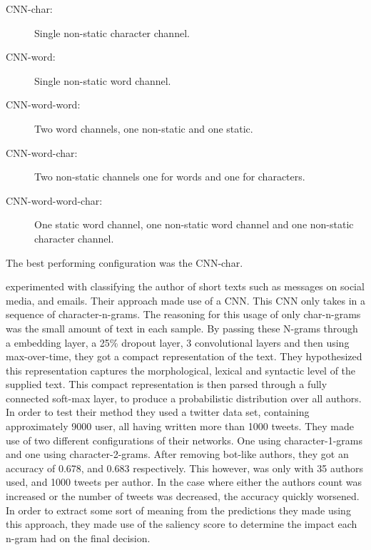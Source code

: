 \begin{description}
    \item[CNN-char:] Single non-static character channel.
    \item[CNN-word:] Single non-static word channel.
    \item[CNN-word-word:] Two word channels, one non-static and one static.
    \item[CNN-word-char:] Two non-static channels one for words and one for
        characters.
    \item[CNN-word-word-char:] One static word channel, one non-static word
        channel and one non-static character channel.
\end{description}

The best performing configuration was the CNN-char.

\citet{shrestha2017} experimented with classifying the author of short texts
such as messages on social media, and emails. Their approach made use of a
\gls{CNN}. This \gls{CNN} only takes in a sequence of character-n-grams. The
reasoning for this usage of only char-n-grams was the small amount of text
in each sample. By passing these N-grams through a embedding layer, a 25\%
dropout layer, 3 convolutional layers and then using max-over-time, they got
a compact representation of the text. They hypothesized this representation
captures the morphological, lexical and syntactic level of the supplied text.
This compact representation is then parsed through a fully connected soft-max
layer, to produce a probabilistic distribution over all authors. In order to
test their method they used a twitter data set, containing approximately 9000
user, all having written more than 1000 tweets. They made use of two different
configurations of their networks. One using character-1-grams and one using
character-2-grams. After removing bot-like authors, they got an accuracy of
0.678, and 0.683 respectively. This however, was only with 35 authors used,
and 1000 tweets per author. In the case where either the authors count was
increased or the number of tweets was decreased, the accuracy quickly worsened.
In order to extract some sort of meaning from the predictions they made using
this approach, they made use of the saliency score to determine the impact each
n-gram had on the final decision.

